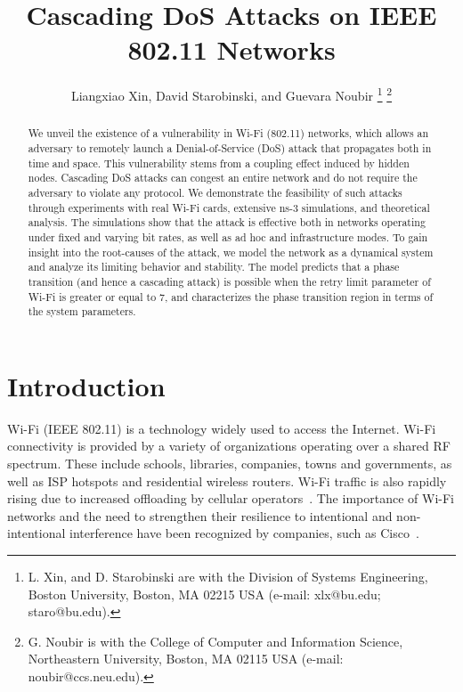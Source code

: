 \documentclass{IEEEtran}
\begin{document}
\title{Cascading DoS Attacks on IEEE 802.11 Networks}


\author{Liangxiao Xin, David Starobinski, and Guevara Noubir
\thanks{L. Xin, and D. Starobinski are with the Division of Systems Engineering, Boston University, Boston, MA 02215 USA (e-mail: xlx@bu.edu;
staro@bu.edu).}
\thanks{G. Noubir is with the College of Computer and Information Science, Northeastern University, Boston, MA 02115 USA (e-mail:
noubir@ccs.neu.edu).}
}













\maketitle


\begin{abstract}
We unveil the existence of a vulnerability in Wi-Fi (802.11) networks, which allows an adversary to remotely launch a Denial-of-Service (DoS)
attack that propagates  both in time and space. This vulnerability stems from a coupling effect induced by hidden nodes. Cascading DoS attacks can
congest an entire network and do not require the adversary to violate any protocol. We demonstrate the feasibility of such attacks through
experiments with real Wi-Fi cards, extensive ns-3 simulations, and theoretical analysis. The simulations show that the attack is effective both in
networks operating under fixed and varying bit rates, as well as ad hoc and infrastructure modes. To gain insight into the root-causes of the
attack, we model the network as a dynamical system and analyze its limiting behavior and stability. The model predicts that a phase transition
(and hence a cascading attack) is possible when the retry limit parameter of Wi-Fi is greater or equal to 7, and characterizes the phase
transition region in terms of the system parameters.
\end{abstract}







\IEEEpeerreviewmaketitle



\section{Introduction}
\label{Introduction}
Wi-Fi (IEEE 802.11) is a
technology widely used to access the Internet. Wi-Fi connectivity is provided by
a variety of organizations operating over a shared RF spectrum. These
include schools, libraries, companies,  towns and governments,  as well
as ISP hotspots and residential wireless routers.
Wi-Fi traffic is also rapidly rising due to increased
offloading by cellular operators~\cite{lee2010mobile}.
The importance of Wi-Fi networks and the need to strengthen their resilience to intentional and
non-intentional interference have been recognized by companies, such as
Cisco~\cite{Cisco}.
\end{document}
